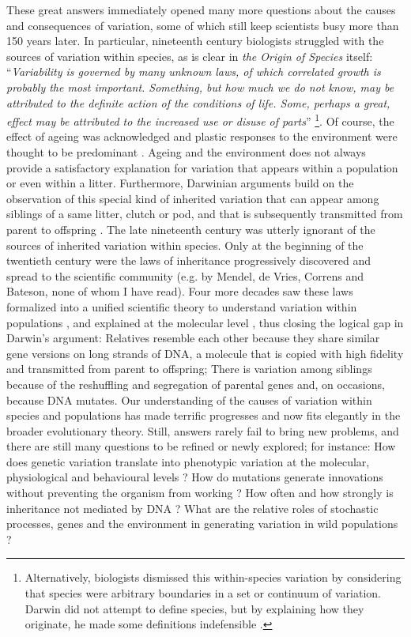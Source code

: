 These great answers immediately opened many more questions about the causes and consequences of variation, some of which still keep scientists busy more than 150 years later. In particular, nineteenth century biologists struggled with the sources of variation within species, as is clear in \emph{the Origin of Species} itself:  ``\emph{Variability is governed by many unknown laws, of which correlated growth is probably the most important. Something, but how much we do not know, may be attributed to the definite action of the conditions of life. Some, perhaps a great, effect may be attributed to the increased use or disuse of parts}'' \parencite[p. 31][]{Darwin1859} \footnote{Alternatively, biologists dismissed this within-species variation by considering that species were arbitrary boundaries in a set or continuum of variation. Darwin did not attempt to define species, but by explaining how they originate, he made some definitions indefensible \parencite[][pp. 129-163]{Wilkins2009}.}. Of course, the effect of ageing was acknowledged and plastic responses to the environment were thought to be predominant \parencite{Wilkins2009}. Ageing and the environment does not always provide a satisfactory explanation for variation that appears within a population or even within a litter.
Furthermore, Darwinian arguments build on the observation of this special kind of inherited variation that can appear among siblings of a same litter, clutch or pod, and that is subsequently transmitted from parent to offspring \parencite[][Chapter 1]{Darwin1859}. The late nineteenth century was utterly ignorant of the sources of inherited variation within species. Only at the beginning of the twentieth century were the laws of inheritance progressively discovered and spread to the scientific community (e.g. by Mendel, de Vries, Correns and Bateson, none of whom I have read). Four more decades saw these laws formalized into a unified scientific theory to understand variation within populations \parencite{Fisher1930}, and explained at the molecular level \parencite{Oswald1943, Watson1953}, thus closing the logical gap in Darwin's argument: Relatives resemble each other because they share similar gene versions on long strands of DNA, a molecule that is copied with high fidelity and transmitted from parent to offspring; There is variation among siblings because of the reshuffling and segregation of parental genes and, on occasions, because DNA mutates. 
Our understanding of the causes of variation within species and populations has made terrific progresses and now fits elegantly in the broader evolutionary theory. Still, answers rarely fail to bring new problems, and there are still many questions to be refined or newly explored; for instance:
How does genetic variation translate into phenotypic variation at the molecular, physiological and behavioural levels \parencite{Kirschner2010}? 
How do mutations generate innovations without preventing the organism from working \parencite{Wagner2014}? 
How often and how strongly is inheritance not mediated by DNA \parencite{Bonduriansky2012}? 
What are the relative roles of stochastic processes, genes and the environment in generating variation in wild populations \parencite{Raj2008, Postma2014}? 

